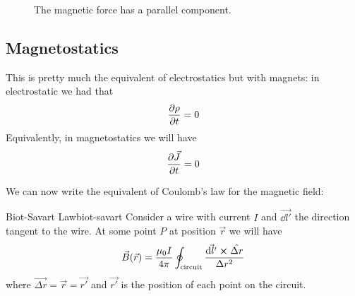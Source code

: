 \documentclass[12pt]{extarticle}
\begin{document}
\begin{figure}[H]
	\centering
	\caption{The magnetic force has a parallel component.}
	\label{fig:mag-field-parallel}
\end{figure}

\subsection{Magnetostatics}

This is pretty much the equivalent of electrostatics but with magnets:
in electrostatic we had that
\begin{equation}
	\pdv{\rho}{t} = 0
\end{equation}
Equivalently, in magnetostatics we will have
\begin{equation}
	\pdv{\vec J}{t} = 0
\end{equation}

We can now write the equivalent of Coulomb's law for the magnetic field:
\begin{theorem}{Biot-Savart Law}{biot-savart}
	Consider a wire with current $I$ and $\vec{\dd l'}$ the direction tangent to the wire.
	At some point $P$ at position $\vec r$ we will have
	\begin{equation}
		\vec B(\vec r) = \frac{\mu_0 I}{4 \pi} \oint_\text{circuit} \frac{\vec{\dd l'} \cross \hat{\Delta r}}{\Delta r^2}
	\end{equation}
	where $\vec{\Delta r} = \vec r = \vec{r '}$ and $\vec{r'}$ is the position of each point on the circuit.
\end{theorem}
\end{document}
